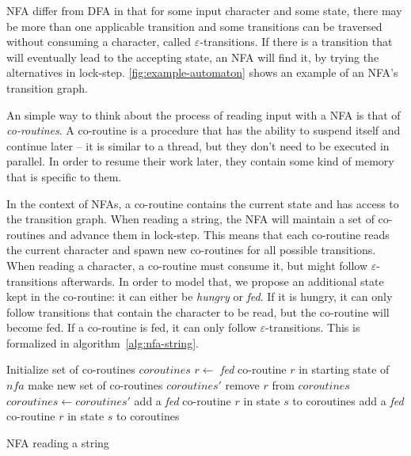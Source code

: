 \documentclass[11pt]{Thesis}
\theoremstyle{definition}
\begin{document}
NFA differ from DFA in that for some input character and some state, there
may be more than one applicable transition and some transitions can be
traversed without consuming a character, called $\varepsilon$-transitions.  If
there is a transition that will eventually lead to the accepting state, an NFA
will find it, by trying the alternatives in lock-step.
\autoref{fig:example-automaton} shows an example of an NFA's transition graph.

An simple way to think about the process of reading input with a NFA is that 
of \emph{co-routines}. A co-routine is a procedure that has the ability to 
suspend itself and continue later -- it is similar to a thread, but they 
don't need to be executed in parallel. In order to resume their work later, 
they contain some kind of memory that is specific to them.

In the context of NFAs, a co-routine contains the current state and has access
to the transition graph. When reading a 
string, the NFA will maintain a set of co-routines and advance them in 
lock-step. This means that each co-routine reads the current character and 
spawn new co-routines for all possible transitions. When reading a character, 
a co-routine must consume it, but might follow $\varepsilon$-transitions 
afterwards. In order to model that, we propose an additional state kept in 
the co-routine: it can either be \emph{hungry} or \emph{fed}. If it is 
hungry, it can only follow transitions that contain the character to be read, 
but the co-routine will become fed. If a co-routine is fed, it can only 
follow $\varepsilon$-transitions. This is formalized in algorithm~\ref{alg:nfa-string}.


\begin{algorithm*}
  \begin{algorithmic}
    \State Initialize set of co-routines $coroutines$
    \State $r\leftarrow$ \emph{fed} co-routine $r$ in starting state of $nfa$
    \State {}
      \State make new set of co-routines $coroutines'$
        \State remove $r$ from $coroutines$
        \State {}
      \EndFor
      \State $coroutines \leftarrow coroutines'$
    \EndFor
  \EndFunction
  \Statex
        \State add a \emph{fed} co-routine $r$ in state $s$ to coroutines
        \State {}
      \EndIf
    \EndFor
  \EndFunction
  \Statex
        \State add a \emph{fed} co-routine $r$ in state $s$ to coroutines
        \State {}
      \EndIf
    \EndFor
  \EndFunction
  \end{algorithmic}
  \caption{\label{alg:nfa-string}NFA reading a string}
\end{algorithm*}
\end{document}
